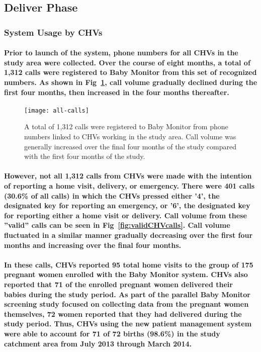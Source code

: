 \subsection{Deliver Phase}

\subsubsection{System Usage by CHVs}
\paragraph{Prior to launch of the system, phone numbers for all CHVs in the study area were collected. Over the course of eight months, a total of 1,312 calls were registered to Baby Monitor from this set of recognized numbers. As shown in Fig~\ref{fig:allCHVcalls}, call volume gradually declined during the first four months, then increased in the four months thereafter.}

\begin{figure}[h]
	\begin{center}
	\texttt{[image: all-calls]}
	\end{center}
	\caption[All CHV Calls]{A total of 1,312 calls were registered to Baby Monitor from phone numbers linked to CHVs working in the study area. Call volume was generally increased over the final four months of the study compared with the first four months of the study.}
	\label{fig:allCHVcalls}
\end{figure}

\paragraph{However, not all 1,312 calls from CHVs were made with the intention of reporting a home visit, delivery, or emergency. There were 401 calls (30.6\% of all calls) in which the CHVs pressed either '4', the designated key for reporting an emergency, or '6', the designated key for reporting either a home visit or delivery. Call volume from these ''valid'' calls can be seen in Fig~\ref{fig:validCHVcalls}. Call volume fluctuated in a similar manner gradually decreasing over the first four months and increasing over the final four months.}

\paragraph{In these calls, CHVs reported 95 total home visits to the group of 175 pregnant women enrolled with the Baby Monitor system. CHVs also reported that 71 of the enrolled pregnant women delivered their babies during the study period. As part of the parallel Baby Monitor screening study focused on collecting data from the pregnant women themselves, 72 women reported that they had delivered during the study period. Thus, CHVs using the new patient management system were able to account for 71 of 72 births (98.6\%) in the study catchment area from July 2013 through March 2014. }

